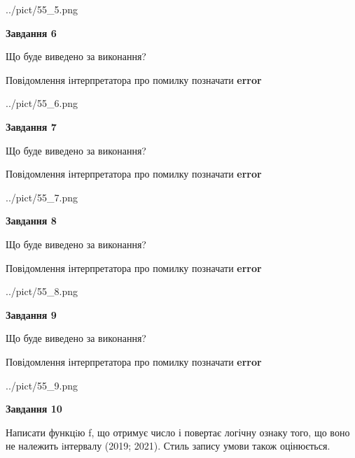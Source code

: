 \documentclass[12pt, ukrainian]{article}
\begin{document}
{\begin {large}
\begin{center}
	{../pict/55_5.png}
\end{center}
\newpage

{\begin {center}\textbf{Завдання 6}\end {center}}\par
Що буде виведено за виконання? \par
Повідомлення інтерпретатора про помилку позначати \textbf{error}

\begin{center}
	{../pict/55_6.png}
\end{center}
\newpage

{\begin {center}\textbf{Завдання 7}\end {center}}\par
Що буде виведено за виконання? \par
Повідомлення інтерпретатора про помилку позначати \textbf{error}

\begin{center}
	{../pict/55_7.png}
\end{center}
\newpage

{\begin {center}\textbf{Завдання 8}\end {center}}\par
Що буде виведено за виконання? \par
Повідомлення інтерпретатора про помилку позначати \textbf{error}

\begin{center}
	{../pict/55_8.png}
\end{center}
\newpage

{\begin {center}\textbf{Завдання 9}\end {center}}\par
Що буде виведено за виконання? \par
Повідомлення інтерпретатора про помилку позначати \textbf{error}

\begin{center}
	{../pict/55_9.png}
\end{center}
\newpage

{\begin {center}\textbf{Завдання 10}\end {center}}\par

Написати функцiю f, що отримує число і повертає логічну ознаку того, що воно не належить iнтервалу (2019; 2021). Стиль запису умови також оцінюється.\par
\newpage

\end {large}}
\end{document}
